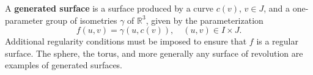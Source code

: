 A \textbf{generated surface} is a surface produced by a curve $c(v)$, $v \in J$, and a one-parameter group of isometries $\gamma$ of $\mathbb{R}^3$, given by the parameterization
$$f(u, v) = \gamma(u, c(v)), \quad (u, v) \in I \times J.$$
Additional regularity conditions must be imposed to ensure that $f$ is a regular surface. The sphere, the torus, and more generally any surface of revolution are examples of generated surfaces.
